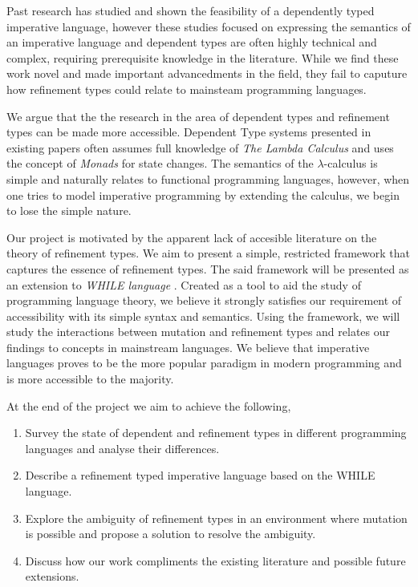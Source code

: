 \documentclass[a4paper,12pt]{report}
\begin{document}
\par
Past research has studied and shown the feasibility of a dependently typed 
imperative language, however these studies focused on expressing the semantics 
of an imperative language and dependent types are often highly 
technical and complex, requiring prerequisite knowledge in the literature. While 
we find these work novel and made important advancedments in the field, 
they fail to caputure how refinement types could relate to 
mainsteam programming languages.

\par
We argue that the the research in the area of dependent types and refinement 
types can be made more accessible. Dependent Type systems presented in 
existing papers often assumes full knowledge of \textit{The Lambda Calculus} 
\cite{lambdaCalculus} and uses the concept of \textit{Monads} \cite{monads} 
for state changes. The semantics of the $\lambda$-calculus is simple and naturally 
relates to functional programming languages, however, when one tries to model 
imperative programming by extending the calculus, we begin to lose the simple 
nature. 

\par
Our project is motivated by the apparent lack of accesible literature on the 
theory of refinement types. We aim to present a simple, restricted framework that 
captures the essence of refinement types. The said framework will be presented as 
an extension to \textit{WHILE language} \cite{whileLanguage}. Created as a tool 
to aid the study of programming language theory, we believe it strongly satisfies 
our requirement of accessibility with its simple syntax and semantics. Using the 
framework, we will study the interactions between mutation and refinement types 
and relates our findings to concepts in mainstream languages. We believe that 
imperative languages proves to be the more popular paradigm in modern 
programming and is more accessible to the majority. 

\par
At the end of the project we aim to achieve the following, 
\begin{enumerate}
  \item Survey the state of dependent and refinement types in different programming 
  languages and analyse their differences.
  \item Describe a refinement typed imperative language based on the WHILE 
  language.
  \item  Explore the ambiguity of refinement types in an environment where 
  mutation is possible and propose a solution to resolve the ambiguity.
  \item Discuss how our work compliments the existing literature and possible 
  future extensions.
\end{enumerate}
\end{document}
